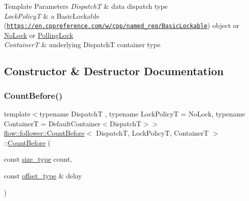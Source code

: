 \begin{DoxyTemplParams}{Template Parameters}
{\em DispatchT} & data dispatch type \\
\hline
{\em Lock\+PolicyT} & a Basic\+Lockable (\href{https://en.cppreference.com/w/cpp/named_req/BasicLockable}{\tt https\+://en.\+cppreference.\+com/w/cpp/named\+\_\+req/\+Basic\+Lockable}) object or \hyperlink{structflow_1_1_no_lock}{No\+Lock} or \hyperlink{structflow_1_1_polling_lock}{Polling\+Lock} \\
\hline
{\em ContainerT} & underlying {\ttfamily DispatchT} container type \\
\hline
\end{DoxyTemplParams}


\subsection{Constructor \& Destructor Documentation}
\mbox{\label{classflow_1_1follower_1_1_count_before_a9bb3a82fbb60dcf7588173d84c4383e9}} 
\subsubsection{\texorpdfstring{Count\+Before()}{CountBefore()}\hspace{0.1cm}{\footnotesize\ttfamily [1/2]}}
{\footnotesize\ttfamily template$<$typename DispatchT , typename Lock\+PolicyT  = No\+Lock, typename ContainerT  = Default\+Container$<$\+Dispatch\+T$>$$>$ \\
\hyperlink{classflow_1_1follower_1_1_count_before}{flow\+::follower\+::\+Count\+Before}$<$ DispatchT, Lock\+PolicyT, ContainerT $>$\+::\hyperlink{classflow_1_1follower_1_1_count_before}{Count\+Before} (\begin{DoxyParamCaption}\item[{const \hyperlink{classflow_1_1follower_1_1_count_before_a80c833853e8f7f856338a984aeacb993}{size\+\_\+type}}]{count,  }\item[{const \hyperlink{classflow_1_1follower_1_1_count_before_a235f01dc3187d79c55aaf13d1f819c15}{offset\+\_\+type} \&}]{delay }\end{DoxyParamCaption})\hspace{0.3cm}{\ttfamily [explicit]}}



